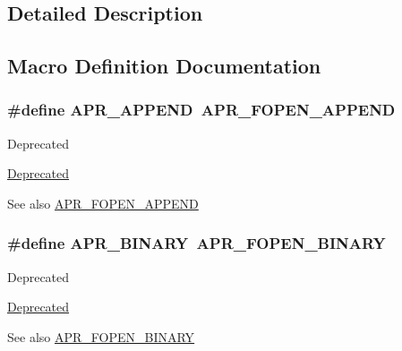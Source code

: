 \subsection{Detailed Description}


\subsection{Macro Definition Documentation}
\subsubsection[{\texorpdfstring{A\+P\+R\+\_\+\+A\+P\+P\+E\+ND}{APR_APPEND}}]{\setlength{\rightskip}{0pt plus 5cm}\#define A\+P\+R\+\_\+\+A\+P\+P\+E\+ND~{\bf A\+P\+R\+\_\+\+F\+O\+P\+E\+N\+\_\+\+A\+P\+P\+E\+ND}}\hypertarget{group__apr__file__open__flags_ga26d3de2bae5c90e5124869f56c141c2e}{}\label{group__apr__file__open__flags_ga26d3de2bae5c90e5124869f56c141c2e}
\begin{DoxyRefDesc}{Deprecated}
\item[\hyperlink{deprecated__deprecated000020}{Deprecated}]\end{DoxyRefDesc}
\begin{DoxySeeAlso}{See also}
\hyperlink{group__apr__file__open__flags_ga45f353db9b71d4760a3f35cf3781cfc8}{A\+P\+R\+\_\+\+F\+O\+P\+E\+N\+\_\+\+A\+P\+P\+E\+ND} 
\end{DoxySeeAlso}
\subsubsection[{\texorpdfstring{A\+P\+R\+\_\+\+B\+I\+N\+A\+RY}{APR_BINARY}}]{\setlength{\rightskip}{0pt plus 5cm}\#define A\+P\+R\+\_\+\+B\+I\+N\+A\+RY~{\bf A\+P\+R\+\_\+\+F\+O\+P\+E\+N\+\_\+\+B\+I\+N\+A\+RY}}\hypertarget{group__apr__file__open__flags_ga0e7556bac0cc0d1dafdf38952a4e4015}{}\label{group__apr__file__open__flags_ga0e7556bac0cc0d1dafdf38952a4e4015}
\begin{DoxyRefDesc}{Deprecated}
\item[\hyperlink{deprecated__deprecated000022}{Deprecated}]\end{DoxyRefDesc}
\begin{DoxySeeAlso}{See also}
\hyperlink{group__apr__file__open__flags_gacb20b3028864f34cb26314fe2cacc3fa}{A\+P\+R\+\_\+\+F\+O\+P\+E\+N\+\_\+\+B\+I\+N\+A\+RY} 
\end{DoxySeeAlso}
